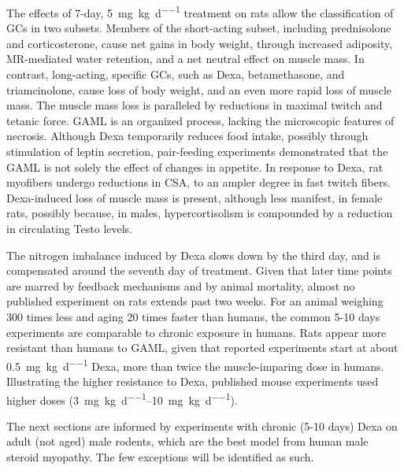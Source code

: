 \documentclass[12pt,english]{report}\usepackage[]{graphicx}\usepackage[]{color}
\begin{document}
The effects of 7-day, \SI{5}{\milli\gram\per\kilo\gram\per\day} treatment
on rats allow the classification of GCs in two subsets\citep{bullock1972relative}.
Members of the short-acting subset, including prednisolone and corticosterone,
cause net gains in body weight, through increased adiposity, MR-mediated
water retention, and a net neutral effect on muscle mass. In contrast,
long-acting, specific GCs, such as Dexa, betamethasone, and triamcinolone,
cause loss of body weight, and an even more rapid loss of muscle mass.
The muscle mass loss is paralleled by reductions in maximal twitch
and tetanic force\citep{alamdari2012loss}. GAML is an organized process,
lacking the microscopic features of necrosis\citep*{nava1996effects}.
Although Dexa temporarily reduces food intake, possibly through stimulation
of leptin secretion\citep{caldefie-chezet2001dexamethasone}, pair-feeding
experiments demonstrated that the GAML is not solely the effect of
changes in appetite\citep{dardevet1995sensitivity,nicastro2012effectsa}.
In response to Dexa, rat myofibers undergo reductions in CSA, to an
ampler degree in fast twitch fibers\citep{prezant1997gender-specific,baptista2013leucine}.
Dexa-induced loss of muscle mass is present, although less manifest,
in female rats, possibly because, in males, hypercortisolism is compounded
by a reduction in circulating Testo levels\citep{prezant1997gender-specific}.

The nitrogen imbalance induced by Dexa slows down by the third day,
and is compensated around the seventh day of treatment\citep{minet-quinard2000induction,bowes1996effect}.
Given that later time points are marred by feedback mechanisms and
by animal mortality, almost no published experiment on rats extends
past two weeks. For an animal weighing 300 times less and aging 20
times faster than humans, the common 5-10 days experiments are comparable
to chronic exposure in humans. Rats appear more resistant than humans
to GAML, given that reported experiments start at about \SI{0.5}{\milli\gram\per\kilo\gram\per\day}
Dexa, more than twice the muscle-imparing dose in humans. Illustrating
the higher resistance to Dexa, published mouse experiments used higher
doses (\SIrange{3}{10}{\milli\gram\per\kilo\gram\per\day}\citep{furlow2013altered,son2015dexamethasone}).

The next sections are informed by experiments with chronic (5-10 days)
Dexa on adult (not aged) male rodents, which are the best model from
human male steroid myopathy. The few exceptions will be identified
as such.
\end{document}
